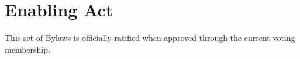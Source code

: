 \documentclass[12pt]{article}
\begin{document}
\section{Enabling Act}
\begin{level} 
    \item This set of Bylaws is officially ratified when approved through the current voting membership.
\end{level}

\end{document}
